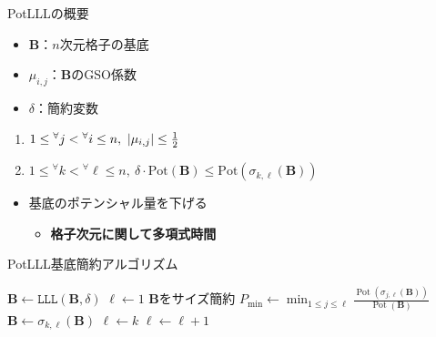 \documentclass[12pt,aspectratio=169,xcolor=dvipsnames,table,dvipdfmx, leqno]{beamer}
\DeclareMathOperator{\Pot}{Pot}
\begin{document}
\begin{frame}[fragile]{PotLLLの概要}
\footnotesize
\begin{minipage}[b]{0.45\columnwidth}
   \begin{Definition}[PotLLL簡約]
        \begin{itemize}
            \item $\bm{B}$：$n$次元格子の基底
            \item $\mu_{i, j}$：$\bm{B}$のGSO係数
            \item $\delta$：簡約変数
        \end{itemize}
        \begin{enumerate}
            \item $1\le{}^\forall j<{}^\forall i\le n,~ \abs{\mu_{i, j}}\le\frac{1}{2}$

            \item $1\le{}^\forall k<{}^\forall \ell\le n,~\delta\cdot \text{Pot}(\bm{B})\le\text{Pot}(\sigma_{k, \ell}(\bm{B}))$
        \end{enumerate}
    \end{Definition}
    \begin{itemize}
        \item 基底のポテンシャル量を下げる
        \begin{itemize}
            \item \textbf{格子次元に関して多項式時間}
        \end{itemize}
    \end{itemize}
\end{minipage}
\hspace{0.03\columnwidth}
\begin{minipage}[b]{0.45\columnwidth}
    \begin{algorithm}[H]
    \footnotesize
        \begin{algorithmic}[1]
            \caption{\footnotesize PotLLL基底簡約アルゴリズム\cite{FSW14}}
            \label{alg_PotLLL}
            \State $\bm{B}\gets \texttt{LLL}(\bm{B}, \delta)$
            \State $\ell \gets 1$
                \State $\bm{B}$をサイズ簡約
                \State $P_\text{min}\gets \min_{1\le j\le \ell}\frac{\Pot(\sigma_{j, \ell}(\bm{B}))}{\Pot(\bm{B})}$
                    \State $\bm{B}\gets \sigma_{k, \ell}(\bm{B})$
                    \State $\ell\gets k$
                \Else
                    \State $\ell\gets\ell +1$
                \EndIf
            \EndWhile
        \end{algorithmic}
    \end{algorithm}
\end{minipage}
\end{frame}
\fi
\end{document}
